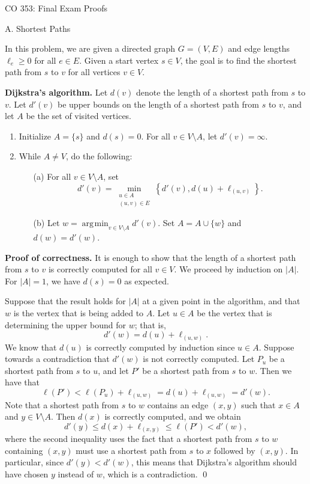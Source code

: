 \documentclass{article}
\DeclareMathOperator*{\argmin}{\arg\!\min}
\begin{document}
\begin{center}
    {\sc \Large CO 353: Final Exam Proofs}
\end{center}

\begin{center} {\sc A. Shortest Paths} \end{center}

In this problem, we are given a directed graph $G = (V, E)$ and edge lengths 
$\ell_e \geq 0$ for all $e \in E$. Given a start vertex $s \in V$, the 
goal is to find the shortest path from $s$ to $v$ for all vertices $v \in V$.  

{\color{violet}
{\bf Dijkstra's algorithm.} Let 
$d(v)$ denote the length of a shortest path from $s$ to $v$. Let 
$d'(v)$ be upper bounds on the length of a shortest path from $s$ to $v$,
and let $A$ be the set of visited vertices. 
\begin{enumerate}
    \item Initialize $A = \{s\}$ and $d(s) = 0$. For all 
    $v \in V \setminus A$, let $d'(v) = \infty$. 
    \item While $A \neq V$, do the following: 
    \begin{enumerate}
        \item [(a)] For all $v \in V \setminus A$, set 
        \[ d'(v) = \min_{\substack{u \in A \\ (u, v) \in E}} 
        \left\{ d'(v), d(u) + \ell_{(u, v)} \right\}. \] 
        \item [(b)] Let $w = \argmin_{v \in V \setminus A} d'(v)$. 
        Set $A = A \cup \{w\}$ and $d(w) = d'(w)$. 
    \end{enumerate}
\end{enumerate}}

{\color{blue}
{\bf Proof of correctness.} It is enough to show that the length of a 
shortest path from $s$ to $v$ is correctly computed for all $v \in V$. 
We proceed by induction on $|A|$. For $|A| = 1$, we have $d(s) = 0$ as expected. 

Suppose that the result holds for $|A|$ at a given point in the algorithm, 
and that $w$ is the vertex that is being added to $A$. Let $u \in A$ 
be the vertex that is determining the upper bound for $w$; that is, 
\[ d'(w) = d(u) + \ell_{(u, w)}. \] 
We know that $d(u)$ is correctly computed by induction since $u \in A$. Suppose towards a 
contradiction that $d'(w)$ is not correctly computed. Let 
$P_u$ be a shortest path from $s$ to $u$, and let $P'$ be a shortest 
path from $s$ to $w$. Then we have that 
\[ \ell(P') < \ell(P_u) + \ell_{(u, w)} = d(u) + \ell_{(u, w)} = d'(w). \] 
Note that a shortest path from $s$ to $w$ contains an edge $(x, y)$ such that 
$x \in A$ and $y \in V \setminus A$. Then $d(x)$ is correctly computed, and we obtain 
\[ d'(y) \leq d(x) + \ell_{(x,y)} \leq \ell(P') < d'(w), \] 
where the second inequality uses the fact that a shortest path from $s$ to $w$ 
containing $(x, y)$ must use a shortest path from $s$ to $x$ followed by 
$(x, y)$. In particular, since $d'(y) < d'(w)$, this means that Dijkstra's 
algorithm should have chosen $y$ instead of $w$, which is a contradiction. \qed}
\end{document}
